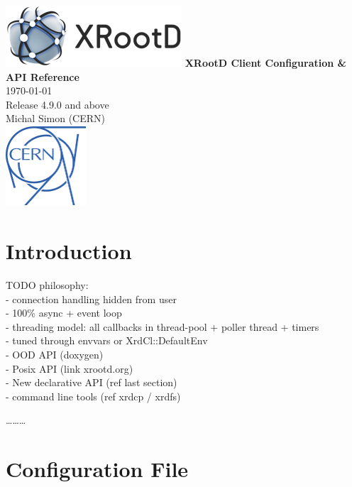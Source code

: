 \documentclass{article}
\begin{document}
\begin{titlepage}

    \centering
    \vfill
    	\includegraphics{xrootd-logo.png}
    \vfill
    	{\huge \textbf{XRootD Client Configuration \& API Reference} \\}
        \vskip3cm
        \today \\
        Release 4.9.0 and above \\
        Michal Simon (CERN) \\
        \vskip0.2cm
        \includegraphics[width=3cm, height=3cm]{cern-logo.png}
    \vfill
    \vfill

\end{titlepage}

\tableofcontents

\newpage

\section{Introduction}
    TODO philosophy: \\
    	- connection handling hidden from user \\
    	- 100\% async + event loop \\
    	- threading model: all callbacks in thread-pool + poller thread + timers \\ 
    	- tuned through envvars or XrdCl::DefaultEnv \\
    	- OOD API (doxygen) \\
    	- Posix API (link xrootd.org) \\
    	- New declarative API (ref last section) \\
    	- command line tools (ref xrdcp / xrdfs)
    	
	\ldots\ldots\ldots
	

\section{Configuration File}
\end{document}
